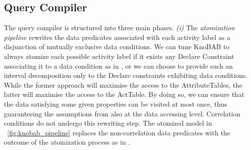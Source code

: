 \subsection{Query Compiler}\label{sec:qc}
The query compiler is structured into three main phases. \textit{(i)} The \textit{atomization pipeline}  rewrites the data predicates 
associated with each activity label as a 
disjunction of mutually exclusive data conditions. We can tune KnoBAB to always atomize each possible activity label if it exists any Declare Constraint associating it to a data condition as in \cite{bpm21}, or we can choose to provide such an interval decomposition only to the Declare constraints exhibiting data conditions. While the former approach will maximise the access to the \textsf{AttributeTable}s, the latter will maximise the access to the \textsf{ActTable}. By doing so, we can ensure that the data satisfying some given properties can be visited at most once, thus guaranteeing the assumptions from \cite{BellatrecheKB21} also at the data accessing level. Correlation conditions do not undergo this rewriting step. The atomized model in \figurename~\ref{fig:knobab_pipeline} replaces the non-correlation data predicates with the outcome of the atomization process as in \cite{bpm21}. 


